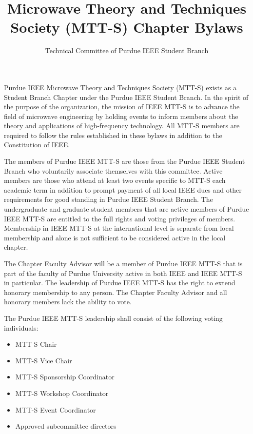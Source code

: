 \documentclass[12pt]{constitution}
\title{Microwave Theory and Techniques Society (MTT-S) Chapter Bylaws}
\author{Technical Committee of Purdue IEEE Student Branch}
\date{}
\begin{document}

\titlecontentspage
\newpage


\label{art:namepurp}

Purdue IEEE Microwave Theory and Techniques Society (MTT-S) exists as a Student Branch Chapter under the Purdue IEEE Student Branch. In the spirit of the purpose of the organization, the mission of IEEE MTT-S is to advance the field of microwave engineering by holding events to inform members about the theory and applications of high-frequency technology. All MTT-S members are required to follow the rules established in these bylaws in addition to the Constitution of IEEE.


\label{art:member}

The members of Purdue IEEE MTT-S are those from the Purdue IEEE Student Branch who voluntarily associate themselves with this committee. Active members are those who attend at least two events specific to MTT-S each academic term in addition to prompt payment of all local IEEE dues and other requirements for good standing in Purdue IEEE Student Branch. The undergraduate and graduate student members that are active members of Purdue IEEE MTT-S are entitled to the full rights and voting privileges of members. Membership in IEEE MTT-S at the international level is separate from local membership and alone is not sufficient to be considered active in the local chapter.

The Chapter Faculty Advisor will be a member of Purdue IEEE MTT-S that is part of the faculty of Purdue University active in both IEEE and IEEE MTT-S in particular. The leadership of Purdue IEEE MTT-S has the right to extend honorary membership to any person. The Chapter Faculty Advisor and all honorary members lack the ability to vote.


\label{art:leader}

The Purdue IEEE MTT-S leadership shall consist of the following voting individuals:
\begin{itemize}
    \item MTT-S Chair
    \item MTT-S Vice Chair
    \item MTT-S Sponsorship Coordinator
    \item MTT-S Workshop Coordinator
    \item MTT-S Event Coordinator
    \item Approved subcommittee directors
\end{itemize}
\end{document}
